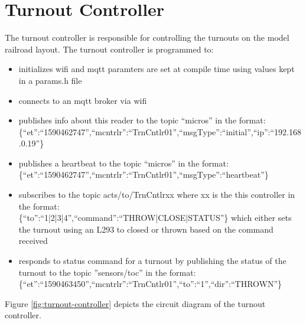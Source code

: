 \section{Turnout Controller}
\label{sec:turnout-controller}
The turnout controller is responsible for controlling the turnouts on the model railroad layout. The turnout controller is programmed to:
\begin{itemize}
    \item initializes \gls{wifi} and \gls{mqtt} paramters are set at compile time using values kept in a params.h file
    \item connects to an \gls{mqtt} broker via \gls{wifi}
    \item publishes info about this reader to the topic ``micros'' in the format: \\
    \{``et'':``1590462747'',``mcntrlr'':``TrnCntlr01'',``msgType'':``initial'',``ip'':``192.168.0.19''\}
    \item publishes a heartbeat to the topic ``micros'' in the format: \\
    \{``et'':``1590462747'',``mcntrlr'':``TrnCntlr01'',``msgType'':``heartbeat''\}
    \item subscribes to the topic acts/to/TrnCntlrxx where xx is the this controller in the format: \\
    \{``to'':``1|2|3|4'',``command'':``THROW|CLOSE|STATUS''\} which either sets the turnout using an L293 to closed or thrown based on the command received
    \item responds to status command for a turnout by publishing the status of the turnout to the topic ''sensors/toc'' in the format: \\
    \{``et'':``1590463450'',``mcntrlr'':``TrnCntlr01'',``to'':``1'',``dir'':``THROWN''\}
\end{itemize}

Figure \ref{fig:turnout-controller} depicts the circuit diagram of the turnout controller.

